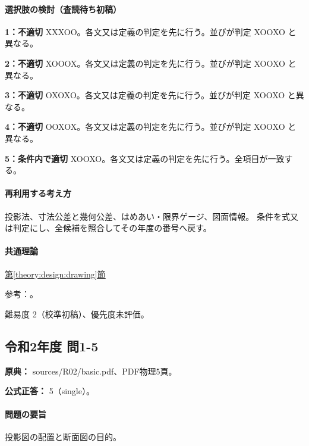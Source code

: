 \paragraph{選択肢の検討（査読待ち初稿）}\mbox{}\par

\noindent\textbf{1：不適切} XXXOO。各文又は定義の判定を先に行う。並びが判定 XOOXO と異なる。\par

\noindent\textbf{2：不適切} XOOOX。各文又は定義の判定を先に行う。並びが判定 XOOXO と異なる。\par

\noindent\textbf{3：不適切} OXOXO。各文又は定義の判定を先に行う。並びが判定 XOOXO と異なる。\par

\noindent\textbf{4：不適切} OOXOX。各文又は定義の判定を先に行う。並びが判定 XOOXO と異なる。\par

\noindent\textbf{5：条件内で適切} XOOXO。各文又は定義の判定を先に行う。全項目が一致する。\par

\paragraph{再利用する考え方} 投影法、寸法公差と幾何公差、はめあい・限界ゲージ、図面情報。 条件を式又は判定にし、全候補を照合してその年度の番号へ戻す。

\paragraph{共通理論} \hyperref[theory:design:drawing]{第\ref*{theory:design:drawing}節}

\par 参考：\cite{design48_iso}。

\par 難易度 2（校準初稿）、優先度未評価。

\subsection{令和2年度 問1-5}
\label{q:r02-reg-basic-1-5}

\noindent\textbf{原典：} sources/R02/basic.pdf、PDF物理5頁。

\textbf{公式正答：} 5（single）。

\paragraph{問題の要旨} 投影図の配置と断面図の目的。


